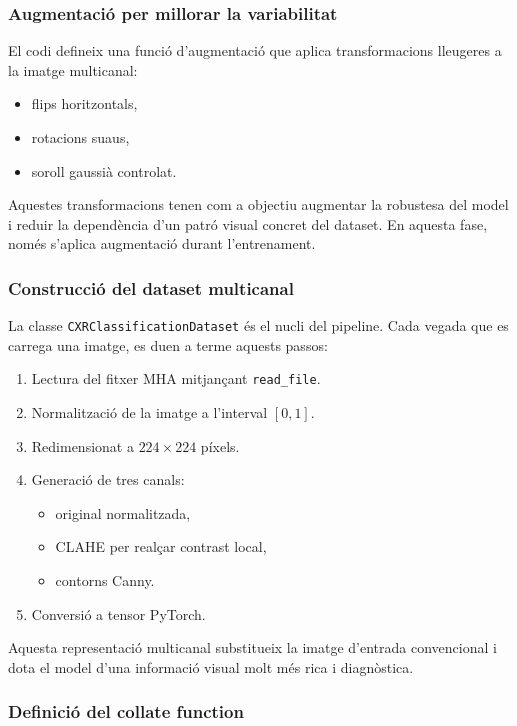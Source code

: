\documentclass[12pt,a4paper]{article}
\begin{document}
\subsubsection{Augmentació per millorar la variabilitat}

El codi defineix una funció d’augmentació que aplica transformacions lleugeres a la
imatge multicanal:

\begin{itemize}
    \item flips horitzontals,
    \item rotacions suaus,
    \item soroll gaussià controlat.
\end{itemize}

Aquestes transformacions tenen com a objectiu augmentar la robustesa del model i reduir
la dependència d’un patró visual concret del dataset. En aquesta fase, només s’aplica
augmentació durant l’entrenament.

\subsubsection{Construcció del dataset multicanal}

La classe \texttt{CXRClassificationDataset} és el nucli del pipeline. Cada vegada que es
carrega una imatge, es duen a terme aquests passos:

\begin{enumerate}
    \item Lectura del fitxer MHA mitjançant \texttt{read\_file}.
    \item Normalització de la imatge a l’interval \([0,1]\).
    \item Redimensionat a \(224\times224\) píxels.
    \item Generació de tres canals:
    \begin{itemize}
        \item original normalitzada,
        \item CLAHE per realçar contrast local,
        \item contorns Canny.
    \end{itemize}
    \item Conversió a tensor PyTorch.
\end{enumerate}

Aquesta representació multicanal substitueix la imatge d'entrada convencional i dota el
model d’una informació visual molt més rica i diagnòstica.

\subsubsection{Definició del collate function}
\end{document}
